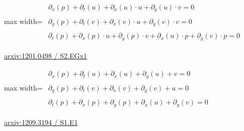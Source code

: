 \documentclass[UTF8,10pt,a4paper,fontset=mac]{ctexart}
\begin{document}
\begin{minipage}{\linewidth}\begin{center}\begin{adjustbox}{max width=\linewidth}$\displaystyle\begin{gathered}\begin{gathered}\partial_{x}(p)+\partial_{t}(u)+\partial_{x}(u)\cdot u+\partial_{y}(u)\cdot v=0\end{gathered}\\[5pt]\begin{gathered}\partial_{y}(p)+\partial_{t}(v)+\partial_{x}(v)\cdot u+\partial_{y}(v)\cdot v=0\end{gathered}\\[5pt]\begin{gathered}\partial_{t}(p)+\partial_{x}(p)\cdot u+\partial_{y}(p)\cdot v+\partial_{x}(u)\cdot p+\partial_{y}(v)\cdot p=0\end{gathered}\end{gathered}$\end{adjustbox}\end{center}{\small\href{https://arxiv.org/html/1201.0498#S2.EGx1}{arxiv:1201.0498 / S2.EGx1}}\par\end{minipage}\par\vspace{6mm}

\begin{minipage}{\linewidth}\begin{center}\begin{adjustbox}{max width=\linewidth}$\displaystyle\begin{gathered}\begin{gathered}\partial_{x}(p)+\partial_{t}(u)+\partial_{x}(u)+\partial_{y}(u)+v=0\end{gathered}\\[5pt]\begin{gathered}\partial_{y}(p)+\partial_{t}(v)+\partial_{x}(v)+\partial_{y}(v)+u=0\end{gathered}\\[5pt]\begin{gathered}\partial_{t}(p)+\partial_{x}(p)+\partial_{y}(p)+\partial_{x}(u)+\partial_{y}(v)=0\end{gathered}\end{gathered}$\end{adjustbox}\end{center}{\small\href{https://arxiv.org/html/1209.3194#S1.E1}{arxiv:1209.3194 / S1.E1}}\par\end{minipage}\par\vspace{6mm}
\end{document}
